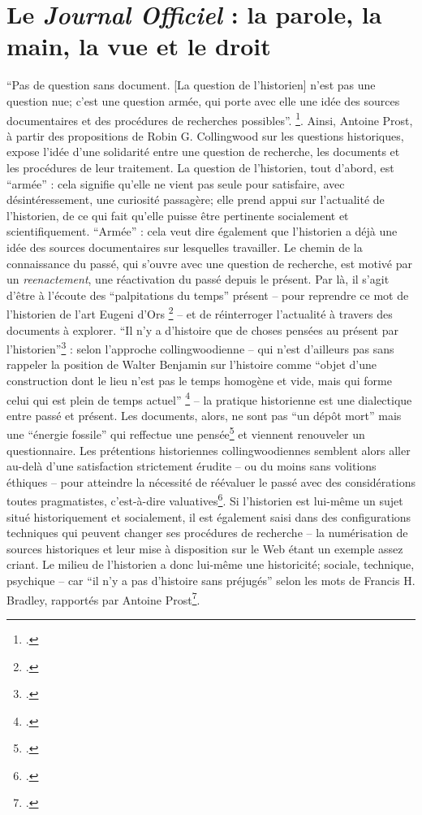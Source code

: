 \chapter{Le \emph{Journal Officiel} : la parole, la main, la vue et le droit}

\enquote{Pas de question sans document. [La question de l'historien] n'est pas une question nue; c'est une question armée, qui porte avec elle une idée des sources documentaires et des procédures de recherches possibles}. \footcite[][80]{prost}. Ainsi, Antoine Prost, à partir des propositions de Robin G. Collingwood sur les questions historiques, expose l'idée d'une solidarité entre une question de recherche, les documents et les procédures de leur traitement. La question de l'historien, tout d'abord, est \enquote{armée} : cela signifie qu'elle ne vient pas seule pour satisfaire, avec désintéressement, une curiosité passagère; elle prend appui sur l'actualité de l'historien, de ce qui fait qu'elle puisse être pertinente socialement et scientifiquement. \enquote{Armée} : cela veut dire également que l'historien a déjà une idée des sources documentaires sur lesquelles travailler. Le chemin de la connaissance du passé, qui s'ouvre avec une question de recherche, est motivé par un \emph{reenactement}, une réactivation du passé depuis le présent. Par là, il s'agit d'être à l'écoute des \enquote{palpitations du temps} présent -- pour reprendre ce mot de l'historien de l'art Eugeni d'Ors \footcite[][]{ors} -- et de réinterroger l'actualité à travers des documents à explorer. \enquote{Il n'y a d'histoire que de choses pensées au présent par l'historien}\footcite[][p.166]{prost} : selon l'approche collingwoodienne -- qui n'est d'ailleurs pas sans rappeler la position de Walter Benjamin sur l'histoire comme \enquote{objet d’une construction dont le lieu n’est pas le temps homogène et vide, mais qui forme celui qui est plein de temps actuel} \footcite[][]{benjamin} -- la pratique historienne est une dialectique entre passé et présent. Les documents, alors, ne sont pas \enquote{un dépôt mort} mais une \enquote{énergie fossile} qui reffectue une pensée\footcite[][]{libera} et viennent renouveler un questionnaire. Les prétentions historiennes collingwoodiennes semblent alors aller au-delà d'une satisfaction strictement érudite -- ou du moins sans volitions éthiques -- pour atteindre la nécessité de réévaluer le passé avec des considérations toutes pragmatistes, c'est-à-dire valuatives\footcite[][]{dewey}. Si l'historien est lui-même un sujet situé historiquement et socialement, il est également saisi dans des configurations techniques qui peuvent changer ses procédures de recherche -- la numérisation de sources historiques et leur mise à disposition sur le Web étant un exemple assez criant. Le milieu de l'historien a donc lui-même une historicité; sociale, technique, psychique --  car \enquote{il n'y a pas d'histoire sans préjugés} selon les mots de Francis H. Bradley, rapportés par Antoine Prost\footcite[][p. 96]{prost}.

